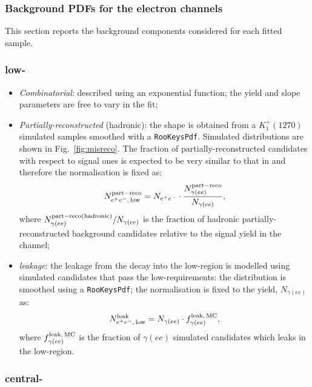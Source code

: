 \subsubsection{Background PDFs for the electron channels}
\label{sec:RKst_misreco_fit}

This section reports the background components considered for each fitted sample.

\subsubsection*{\BdToKstee low-\qsq}

\begin{itemize}

\item \textit{Combinatorial}: described using an exponential function; the yield and slope parameters are free to vary in the fit;

\item \textit{Partially-reconstructed} (hadronic): the shape is obtained from a $K_1^+(1270)$ simulated samples smoothed with
a \verb!RooKeysPdf!. Simulated distributions are shown in Fig.~\ref{fig:misreco}. The fraction of partially-reconstructed 
candidates with respect to signal ones is expected to be very similar to that
in \BdToKstGee and therefore the normalisation is fixed as:
%
$$N_{e^+ e^-, \, {\rm low}}^{\rm part-reco} = N_{e^+ e^-} \cdot \frac{N_{\gamma(ee)}^{\rm part-reco}}{N_{\gamma(ee)}},$$
%
where $N_{\gamma(ee)}^{\rm part-reco (hadronic)}/N_{\gamma(ee)}$ is the fraction of hadronic partially-reconstructed background candidates relative to the signal yield in the \BdToKstGee channel;

\item \textit{\BdToKstG leakage}: the leakage from the \BdToKstGee decay into the low-\qsq region is modelled using simulated candidates that pass the low-\qsq requirements: the distribution is smoothed using a \verb!RooKeysPdf!; the normalisation is fixed to the \BdToKstGee yield, $N_{\gamma(ee)}$ as:
%
$$N_{e^+ e^-, \, {\rm low}}^{\rm leak} = N_{\gamma(ee)} \cdot f_{\gamma(ee)}^{\rm leak, \,MC},$$
%
where $f_{\gamma(ee)}^{\rm leak, \,MC}$ is the fraction of $\gamma(ee)$ simulated candidates which leaks in the low-\qsq region.

\end{itemize}


\subsubsection*{\BdToKstee central-\qsq}


